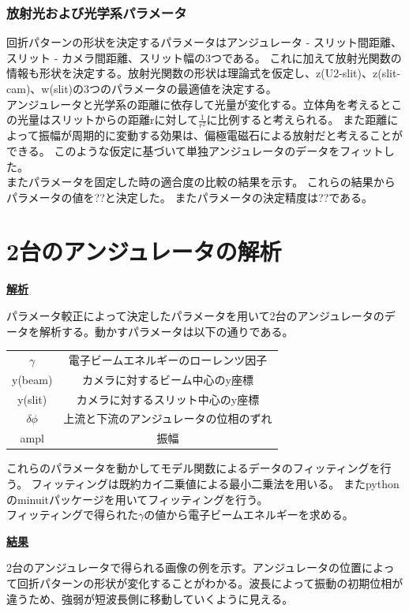\documentclass[a4paper,11pt,uplatex]{jsbook}
\begin{document}
\subsubsection{放射光および光学系パラメータ}
回折パターンの形状を決定するパラメータはアンジュレータ - スリット間距離、スリット - カメラ間距離、スリット幅の3つである。
これに加えて放射光関数の情報も形状を決定する。放射光関数の形状は理論式を仮定し、z(U2-slit)、z(slit-cam)、w(slit)の3つのパラメータの最適値を決定する。\\
アンジュレータと光学系の距離に依存して光量が変化する。立体角を考えるとこの光量はスリットからの距離rに対して$\frac{1}{r^2}$に比例すると考えられる。
また距離によって振幅が周期的に変動する効果は、偏極電磁石による放射だと考えることができる。
このような仮定に基づいて単独アンジュレータのデータをフィットした。\\
またパラメータを固定した時の適合度の比較の結果を示す。
これらの結果からパラメータの値を??と決定した。
またパラメータの決定精度は??である。

\section{2台のアンジュレータの解析}
\noindent \textbf{\underline{解析}}\par
パラメータ較正によって決定したパラメータを用いて2台のアンジュレータのデータを解析する。動かすパラメータは以下の通りである。
\begin{table}[h]
\centering
\begin{tabular}{cc}
  $\gamma$ & 電子ビームエネルギーのローレンツ因子 \\
  y(beam) & カメラに対するビーム中心のy座標 \\
  y(slit) & カメラに対するスリット中心のy座標 \\
  $\delta \phi$ & 上流と下流のアンジュレータの位相のずれ\\
  ampl & 振幅
\end{tabular}
\end{table}
これらのパラメータを動かしてモデル関数によるデータのフィッティングを行う。
フィッティングは既約カイ二乗値による最小二乗法を用いる。
またpythonのminuitパッケージを用いてフィッティングを行う。\\
フィッティングで得られた$\gamma$の値から電子ビームエネルギーを求める。

\noindent \textbf{\underline{結果}}\par
2台のアンジュレータで得られる画像の例を示す。アンジュレータの位置によって回折パターンの形状が変化することがわかる。波長によって振動の初期位相が違うため、強弱が短波長側に移動していくように見える。
\end{document}
